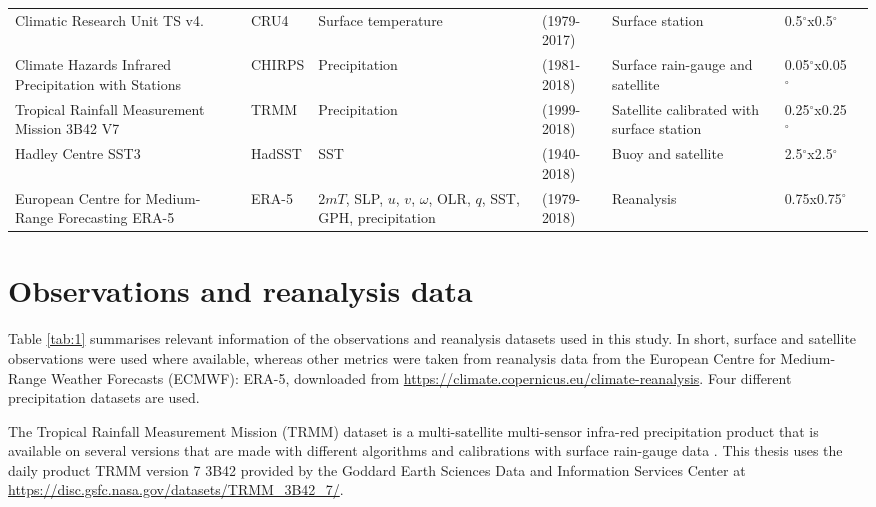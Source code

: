\begin{sidewaystable}
\begin{tabular}{p{5cm}|p{1.47cm}p{3.45cm}p{2.12cm}p{4.2cm}p{2.12cm}p{3.54cm}}
Climatic Research Unit TS  v4.     & CRU4         & Surface temperature  & (1979-2017)       &  Surface station    &  0.5$^\circ$x0.5$^\circ$   &        \citep{harris2014}                            \\
  Climate Hazards Infrared Precipitation with Stations   & CHIRPS          & Precipitation       & (1981-2018)       &  Surface rain-gauge and satellite               &  0.05$^\circ$x0.05$^\circ$ & \citep{funk2015}              \\
Tropical Rainfall Measurement Mission 3B42 V7       & TRMM          & Precipitation       & (1999-2018)   & Satellite calibrated with surface station   & 0.25$^\circ$x0.25$^\circ$  &  \citep{mission2011} \\
Hadley Centre SST3                           & HadSST          & SST               & (1940-2018)   & Buoy and satellite              & 2.5$^\circ$x2.5$^\circ$  &  \citep{kennedy2011} \\
European Centre for Medium-Range Forecasting ERA-5                            & ERA-5             & $2mT$, SLP, $u$, $v$, $\omega$, OLR, $q$, SST, GPH, precipitation    &  (1979-2018)    &  Reanalysis       & 0.75x0.75$^\circ$ &  \citep{era5,era5hersbach}
\end{tabular}

\end{sidewaystable}

\section{Observations and reanalysis data}
Table \ref{tab:1} summarises relevant information of the observations and reanalysis datasets used in this study.
In short, surface and satellite observations were used where available, whereas other metrics were taken from reanalysis data from the
European Centre for Medium-Range Weather Forecasts (ECMWF): ERA-5, downloaded from \url{https://climate.copernicus.eu/climate-reanalysis}.
Four different precipitation datasets are used. 

The Tropical Rainfall Measurement Mission (TRMM) dataset is a multi-satellite multi-sensor infra-red precipitation product that is available on several versions that are made with different algorithms and calibrations with surface rain-gauge data \citep{huffman2007}. This thesis uses the daily product TRMM version 7 3B42 provided by the Goddard Earth Sciences Data and Information Services Center \citep{mission2011trmm} at \url{https://disc.gsfc.nasa.gov/datasets/TRMM_3B42_7/}.

